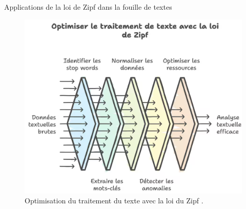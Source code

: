 \documentclass[xetex,xcolor={table,usenames,dvipsnames}]{beamer}
\begin{document}
\begin{frame}{Applications de la loi de Zipf dans la fouille de textes}
			\begin{figure}[h] %
		\centering
		\includegraphics[width=0.80\linewidth]{img/optimisation_zipf.png}
		\caption{Optimisation du traitement du texte avec la loi du Zipf \citep{rherrad}.}
		\label{fig:optimisation_zipf}
	\end{figure}
\end{frame}


\begin{frame}[allowframebreaks]
		\printbibliography
\end{frame}
\end{document}
